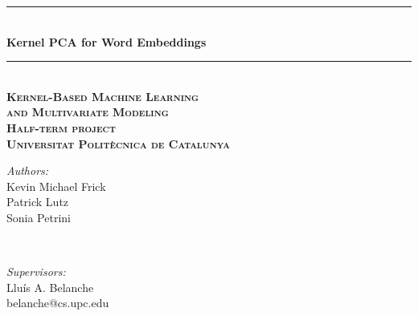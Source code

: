 \documentclass[a4paper,times,numbered,print,index, table, xcdraw]{article}
\newcommand{\HRule}{\rule{\linewidth}{0.5mm}} %
\begin{document}
\begin{titlepage}

\center %



\HRule \\[0.4cm]
{ \huge \bfseries Kernel PCA for Word Embeddings }\\[0.4cm] %
\HRule \\[1.5cm]

\textsc{\huge \textbf{Kernel-Based Machine Learning\\and Multivariate Modeling}}\\[1.5cm]

\textsc{\huge \textbf{Half-term project}}\\[1.5cm]

\textsc{\Large \textbf{Universitat Polit\`ecnica de Catalunya}}\\[1.5cm]


\vspace{0.8cm}
\begin{minipage}{0.4\textwidth}
\begin{flushleft} \large
\Large \emph{Authors:}\\[0.1cm]
\Large Kevin Michael Frick \\
Patrick Lutz \\
Sonia Petrini

\end{flushleft}
\end{minipage}
~
\begin{minipage}{0.4\textwidth}
\begin{flushright} \large
\Large \emph{Supervisors:} \\[0.1cm]
\Large Lluís A. Belanche \\
belanche@cs.upc.edu \\[0.1cm]
\end{flushright}
\vspace{-1.47cm}
\end{minipage}\\[3cm]


\end{titlepage}
\end{document}
